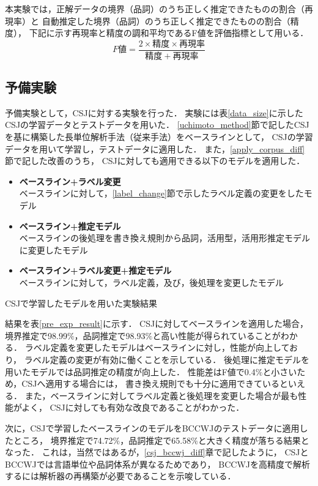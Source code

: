 \documentclass[japanese]{jnlp_1.4}
\begin{document}
本実験では，正解データの境界（品詞）のうち正しく推定できたものの割合（再現率）と
自動推定した境界（品詞）のうち正しく推定できたものの割合（精度），
下記に示す再現率と精度の調和平均であるF値を評価指標として用いる．
\[
F値= \frac{2 \times 精度 \times 再現率}{精度 + 再現率}
\]


\subsection{予備実験}
\label{pre_exp}

予備実験として，CSJに対する実験を行った．
実験には表\ref{data_size}に示したCSJの学習データとテストデータを用いた．
\ref{uchimoto_method}節で記したCSJを基に構築した長単位解析手法（従来手法）をベースラインとして，
CSJの学習データを用いて学習し，テストデータに適用した．
また，\ref{apply_corpus_diff}節で記した改善のうち，
CSJに対しても適用できる以下のモデルを適用した．
\begin{itemize}
\item {\bf ベースライン+ラベル変更} \\
ベースラインに対して，\ref{label_change}節で示したラベル定義の変更をしたモデル
\item {\bf ベースライン+推定モデル} \\
ベースラインの後処理を書き換え規則から品詞，活用型，活用形推定モデルに変更したモデル
\item {\bf ベースライン+ラベル変更+推定モデル} \\
ベースラインに対して，ラベル定義，及び，後処理を変更したモデル
\end{itemize}

\begin{table}[b]
\caption{CSJで学習したモデルを用いた実験結果}
\label{pre_exp_result}

\end{table}

結果を表\ref{pre_exp_result}に示す．
CSJに対してベースラインを適用した場合，
境界推定で98.99$\%$，品詞推定で98.93$\%$と高い性能が得られていることがわかる．
ラベル定義を変更したモデルはベースラインに対し，性能が向上しており，
ラベル定義の変更が有効に働くことを示している．
後処理に推定モデルを用いたモデルでは品詞推定の精度が向上した．
性能差はF値で0.4$\%$と小さいため，CSJへ適用する場合には，
書き換え規則でも十分に適用できているといえる．
また，ベースラインに対してラベル定義と後処理を変更した場合が最も性能がよく，
CSJに対しても有効な改良であることがわかった．

次に，CSJで学習したベースラインのモデルをBCCWJのテストデータに適用したところ，
境界推定で74.72$\%$，品詞推定で65.58$\%$と大きく精度が落ちる結果となった．
これは，当然ではあるが，\ref{csj_bccwj_diff}章で記したように，
CSJとBCCWJでは言語単位や品詞体系が異なるためであり，
BCCWJを高精度で解析するには解析器の再構築が必要であることを示唆している．
\end{document}
